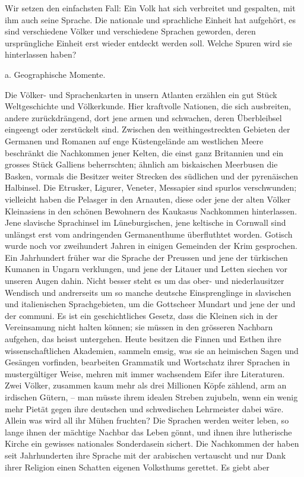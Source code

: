 Wir setzen den einfachsten Fall: Ein Volk hat sich verbreitet und gespalten, mit ihm auch seine Sprache. Die nationale und sprachliche \label{fp.155} Einheit hat aufgehört, es sind verschiedene Völker und verschiedene Sprachen geworden, deren ursprüngliche Einheit erst wieder entdeckt werden soll. Welche Spuren wird sie hinterlassen haben?

a. Geographische Momente.\label{III.I.I.2Aa}

Die Völker- und Sprachenkarten in unsern Atlanten erzählen ein gut Stück Weltgeschichte und Völkerkunde. Hier kraftvolle Nationen, die sich ausbreiten, andere zurückdrängend, dort jene armen und schwachen, deren Überbleibsel eingeengt oder zerstückelt sind. Zwischen den weithingestreckten Gebieten der Germanen und Romanen auf enge Küstengelände am westlichen Meere beschränkt die Nachkommen jener Kelten, die einst ganz Britannien und ein grosses Stück Galliens beherrschten; ähnlich am biskaischen Meerbusen die Basken, vormals die Besitzer weiter Strecken des südlichen  und der pyrenäischen Halbinsel. Die Etrusker, Ligurer, Veneter, Messapier sind spurlos verschwunden; vielleicht haben die Pelasger in den Arnauten, diese oder jene der alten Völker Kleinasiens in den schönen Bewohnern des Kaukasus Nachkommen hinterlassen. Jene slavische Sprachinsel im Lüneburgischen, jene keltische in Cornwall sind unlängst erst vom andringenden Germanenthume überfluthtet worden. Gotisch wurde noch vor zweihundert Jahren in einigen Gemeinden der Krim gesprochen. Ein Jahrhundert früher war die Sprache der Preussen und jene der türkischen Kumanen in Ungarn verklungen, und jene der Litauer und Letten siechen vor unseren Augen dahin. Nicht besser steht es um das ober- und niederlausitzer Wendisch und andrerseits um so manche deutsche Einsprenglinge in slavischen und italienischen Sprachgebieten, um die Gottscheer Mundart und jene der  und der  communi. Es ist ein geschichtliches Gesetz, dass die Kleinen sich in der Vereinsamung nicht halten können; sie müssen in den grösseren Nachbarn aufgehen, das heisst untergehen. Heute besitzen die Finnen und Esthen ihre wissenschaftlichen Akademien, sammeln emsig, was sie an heimischen Sagen und Gesängen vorfinden, bearbeiten Grammatik und Wortschatz ihrer Sprachen in mustergültiger Weise, mehren mit immer wachsendem Eifer ihre Literaturen. Zwei Völker, zusammen kaum mehr als drei Millionen Köpfe zählend, arm an irdischen Gütern, – man müsste ihrem idealen Streben zujubeln, wenn ein wenig mehr Pietät gegen ihre deutschen und schwedischen Lehrmeister dabei wäre. Allein was wird all ihr Mühen fruchten? Die Sprachen werden weiter leben, so lange ihnen der \label{fp.156} mächtige Nachbar das Leben gönnt, und ihnen ihre lutherische Kirche ein gewisses nationales Sonderdasein sichert. Die Nach\label{sp.147}kommen der  haben seit Jahrhunderten ihre Sprache mit der arabischen vertauscht und nur Dank ihrer Religion einen Schatten eigenen Volksthums gerettet. Es giebt aber 